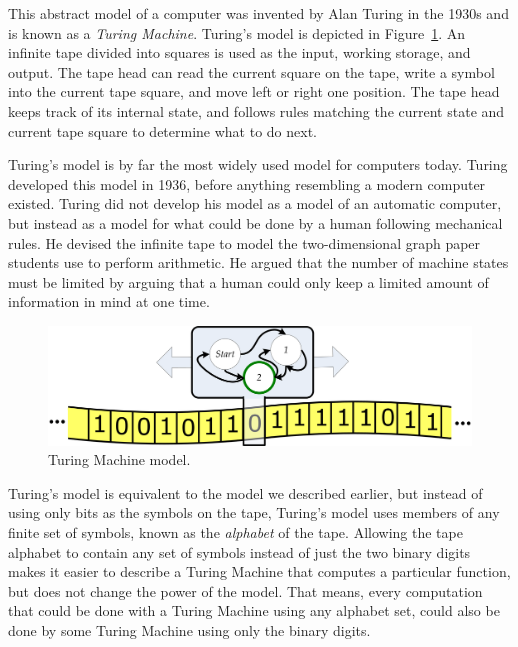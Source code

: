 \begin{schemeregion}
This abstract model of a computer was invented by Alan Turing in the 1930s and is known as a \emph{Turing Machine}.  
Turing's model is depicted in Figure~\ref{fig:tm}.  An infinite tape divided into squares is used as the input, working storage, and output.  The tape head can read the current square on the tape, write a symbol into the current tape square, and move left or right one position.  The tape head keeps track of its internal state, and follows rules matching the current state and current tape square to determine what to do next.  

Turing's model is by far the most widely used model for computers today.  Turing developed this model in 1936, before anything resembling a modern computer existed.  Turing did not develop his model as a model of an automatic computer, but instead as a model for what could be done by a human following mechanical rules.  He devised the infinite tape to model the two-dimensional graph paper students use to perform arithmetic.  He argued that the number of machine states must be limited by arguing that a human could only keep a limited amount of information in mind at one time.  

\begin{figure}[bt]
\begin{center}
\vspace*{1.0ex}
\includegraphics[width=4.8in]{figures/tm-model.png}
\caption{Turing Machine model.\label{fig:tm}}
\end{center} 
\end{figure}

Turing's model is equivalent to the model we described earlier, but instead of using only bits as the symbols on the tape, Turing's model uses members of any finite set of symbols, known as the \emph{alphabet} of the tape.  Allowing the tape alphabet to contain any set of symbols instead of just the two binary digits makes it easier to describe a Turing Machine that computes a particular function, but does not change the power of the model.  That means, every computation that could be done with a Turing Machine using any alphabet set, could also be done by some Turing Machine using only the binary digits.  


\end{schemeregion}
